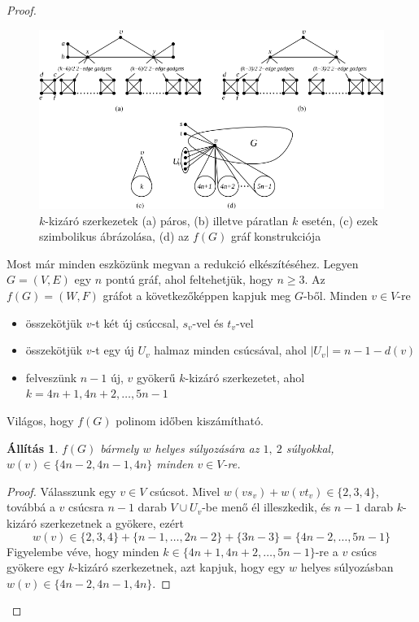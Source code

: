 \documentclass[12pt, a4paper]{report}
\newtheorem{áll}[tét]{Állítás}
\theoremstyle{remark}
\theoremstyle{definition}
\begin{document}
\begin{proof}
\begin{figure}[!h]
\centering
\includegraphics[width=\linewidth]{./images/gadgets12}
\caption{$k$-kizáró szerkezetek (a) páros, (b) illetve páratlan $k$ esetén, (c) ezek szimbolikus ábrázolása, (d) az $f(G)$ gráf konstrukciója}
\label{fig:gadgets12}
\end{figure}

Most már minden eszközünk megvan a redukció elkészítéséhez. Legyen $G = (V, E)$ egy $n$ pontú gráf, ahol feltehetjük, hogy $n \geq 3$. Az $f(G) = (W, F)$ gráfot a következőképpen kapjuk meg $G$-ből. Minden $v \in V$-re
\begin{itemize}
\item összekötjük $v$-t két új csúccsal, $s_v$-vel és $t_v$-vel
\item összekötjük $v$-t egy új $U_v$ halmaz minden csúcsával, ahol $|U_v| = n - 1 - d(v)$
\item felveszünk $n - 1$ új, $v$ gyökerű $k$-kizáró szerkezetet, ahol $k = 4n + 1, 4n + 2, \ldots, 5n - 1$
\end{itemize}

Világos, hogy $f(G)$ polinom időben kiszámítható.

\begin{áll} \label{pro:npreduct12}
$f(G)$ bármely $w$ helyes súlyozására az $1,\ 2$ súlyokkal, $w(v) \in \lbrace 4n - 2, 4n - 1, 4n \rbrace$ minden $v \in V$-re.
\end{áll}

\begin{proof}
Válasszunk egy $v \in V$ csúcsot. Mivel $w(vs_v) + w(vt_v) \in \lbrace 2, 3, 4 \rbrace$, továbbá a $v$ csúcsra $n - 1$ darab $V \cup U_v$-be menő él illeszkedik, és $n - 1$ darab $k$-kizáró szerkezetnek a gyökere, ezért
\begin{equation*}
w(v) \in \lbrace 2, 3, 4 \rbrace + \lbrace n - 1, \ldots, 2n - 2 \rbrace + \lbrace 3n - 3 \rbrace = \lbrace 4n - 2, \ldots, 5n - 1 \rbrace
\end{equation*}
Figyelembe véve, hogy minden $k \in \lbrace 4n + 1, 4n + 2, \ldots, 5n - 1 \rbrace$-re a $v$ csúcs gyökere egy $k$-kizáró szerkezetnek, azt kapjuk, hogy egy $w$ helyes súlyozásban $w(v) \in \lbrace 4n - 2, 4n - 1, 4n \rbrace$.
\end{proof}


\end{proof}
\end{document}
